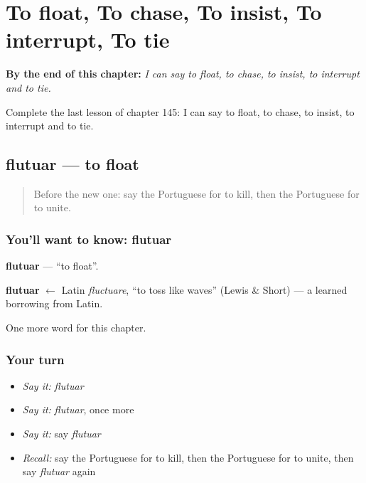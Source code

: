 
\chapter{To float, To chase, To insist, To interrupt, To tie}
\label{ch:pt-to-float-to-chase-to-insist-to-interrupt-to-tie}

\begin{chapteropening}
\textbf{By the end of this chapter:} \emph{I can say to float, to chase, to insist, to interrupt and to tie.}

Complete the last lesson of chapter 145: I can say to float, to chase, to insist, to interrupt and to tie.
\end{chapteropening}

\section[flutuar]{flutuar — to float}

\label{lesson:PT-C145-flutuar}



\begin{quote}
Before the new one: say the Portuguese for to kill, then the Portuguese for to unite.
\end{quote}

\subsection*{You'll want to know: flutuar}
\textbf{flutuar} — \textquotedblleft{}to float\textquotedblright{}.

\begin{cousinweb}
\textbf{flutuar} $\leftarrow$ Latin \emph{fluctuare}, \textquotedblleft{}to toss like waves\textquotedblright{} (Lewis \& Short) — a learned borrowing from Latin.
\end{cousinweb}

\begin{grammarlens}[title={What you've built}]
One more word for this chapter.
\end{grammarlens}

\subsection*{Your turn}
\begin{itemize}
\raggedright
  \item \emph{Say it:} \emph{flutuar}
  \item \emph{Say it:} \emph{flutuar}, once more
  \item \emph{Say it:} say \emph{flutuar}
  \item \emph{Recall:} say the Portuguese for to kill, then the Portuguese for to unite, then say \emph{flutuar} again
\end{itemize}

